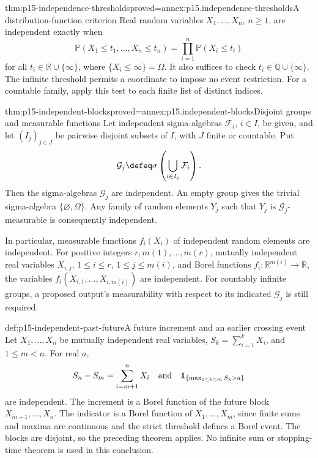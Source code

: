 \begin{hbtheorem}{thm:p15-independence-thresholds}{proved=annex:p15.independence-thresholds}{A distribution-function criterion}
Real random variables \(X_1,\ldots,X_n\), \(n\geq1\), are
independent exactly when
\[
 \mathbb P(X_1\leq t_1,\ldots,X_n\leq t_n)
                        =\prod_{i=1}^n\mathbb P(X_i\leq t_i)
\]
for all \(t_i\in\mathbb R\cup\{\infty\}\), where
\(\{X_i\leq\infty\}=\Omega\). It also suffices to check
\(t_i\in\mathbb Q\cup\{\infty\}\). The infinite threshold
permits a coordinate to impose no event restriction. For a countable
family, apply this test to each finite list of distinct indices.
\end{hbtheorem}

\begin{hbtheorem}{thm:p15-independent-blocks}{proved=annex:p15.independent-blocks}{Disjoint groups and measurable functions}
Let independent sigma-algebras \(\mathcal F_i\), \(i\in I\),
be given, and let \((I_j)_{j\in J}\) be pairwise disjoint subsets
of \(I\), with \(J\) finite or countable. Put
\[
 \mathcal G_j\defeq\sigma\left(\bigcup_{i\in I_j}\mathcal F_i\right).
\]
Then the sigma-algebras \(\mathcal G_j\) are independent.
An empty group gives the trivial sigma-algebra \(\{\varnothing,\Omega\}\).
Any family of random elements \(Y_j\) such that \(Y_j\) is
\(\mathcal G_j\)-measurable is consequently independent.

In particular, measurable functions \(f_i(X_i)\) of independent
random elements are independent. For positive integers \(r,m(1),\ldots,m(r)\),
mutually independent real variables
\(X_{i,j}\), \(1\leq i\leq r\), \(1\leq j\leq m(i)\),
and Borel functions \(f_i:\mathbb R^{m(i)}\to\mathbb R\),
the variables \(f_i(X_{i,1},\ldots,X_{i,m(i)})\) are independent.
For countably infinite groups, a proposed output's measurability with
respect to its indicated \(\mathcal G_j\) is still required.
\end{hbtheorem}

\begin{hbexample}{def:p15-independent-past-future}{A future increment and an earlier crossing event}
Let \(X_1,\ldots,X_n\) be mutually independent real variables,
\(S_k=\sum_{i=1}^kX_i\), and \(1\leq m<n\). For real \(a\),
\[
 S_n-S_m=\sum_{i=m+1}^nX_i
 \quad\hbox{and}\quad
 \mathbf1_{\{\max_{1\leq k\leq m}S_k>a\}}
\]
are independent. The increment is a Borel function of the future block
\(X_{m+1},\ldots,X_n\). The indicator is a Borel function of
\(X_1,\ldots,X_m\), since finite sums and maxima are continuous
and the strict threshold defines a Borel event. The blocks are disjoint,
so the preceding theorem applies. No infinite sum or stopping-time theorem
is used in this conclusion.
\end{hbexample}

